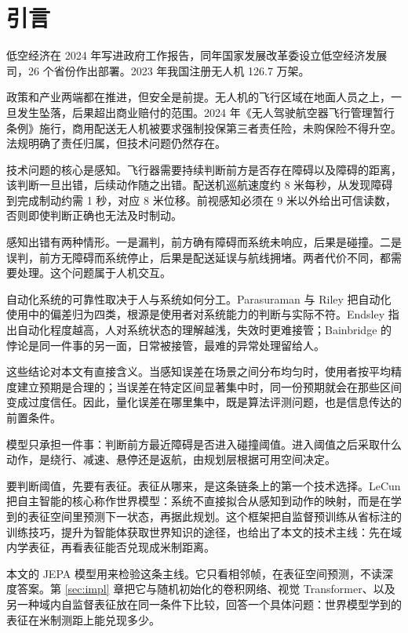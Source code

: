 \documentclass[12pt,a4paper]{ctexart}
\begin{document}
\section{引言}

低空经济在 2024 年写进政府工作报告，同年国家发展改革委设立低空经济发展司，26 个省份作出部署。2023 年我国注册无人机 126.7 万架。

政策和产业两端都在推进，但安全是前提。无人机的飞行区域在地面人员之上，一旦发生坠落，后果超出商业赔付的范围。2024 年《无人驾驶航空器飞行管理暂行条例》施行，商用配送无人机被要求强制投保第三者责任险，未购保险不得升空。法规明确了责任归属，但技术问题仍然存在。

技术问题的核心是感知。飞行器需要持续判断前方是否存在障碍以及障碍的距离，该判断一旦出错，后续动作随之出错。配送机巡航速度约 8 米每秒，从发现障碍到完成制动约需 1 秒，对应 8 米位移。前视感知必须在 9 米以外给出可信读数，否则即使判断正确也无法及时制动。

感知出错有两种情形。一是漏判，前方确有障碍而系统未响应，后果是碰撞。二是误判，前方无障碍而系统停止，后果是配送延误与航线拥堵。两者代价不同，都需要处理。这个问题属于人机交互。

自动化系统的可靠性取决于人与系统如何分工。Parasuraman 与 Riley 把自动化使用中的偏差归为四类，根源是使用者对系统能力的判断与实际不符\cite{parasuraman}。Endsley 指出自动化程度越高，人对系统状态的理解越浅，失效时更难接管\cite{endsley}；Bainbridge 的悖论是同一件事的另一面，日常被接管，最难的异常处理留给人\cite{bainbridge}。

这些结论对本文有直接含义。当感知误差在场景之间分布均匀时，使用者按平均精度建立预期是合理的；当误差在特定区间显著集中时，同一份预期就会在那些区间变成过度信任。因此，量化误差在哪里集中，既是算法评测问题，也是信息传达的前置条件。

模型只承担一件事：判断前方最近障碍是否进入碰撞阈值。进入阈值之后采取什么动作，是绕行、减速、悬停还是返航，由规划层根据可用空间决定。

要判断阈值，先要有表征。表征从哪来，是这条链条上的第一个技术选择。LeCun 把自主智能的核心称作世界模型：系统不直接拟合从感知到动作的映射，而是在学到的表征空间里预测下一状态，再据此规划\cite{lecun}。这个框架把自监督预训练从省标注的训练技巧，提升为智能体获取世界知识的途径，也给出了本文的技术主线：先在域内学表征，再看表征能否兑现成米制距离。

本文的 JEPA 模型用来检验这条主线。它只看相邻帧，在表征空间预测，不读深度答案。第 \ref{sec:impl} 章把它与随机初始化的卷积网络、视觉 Transformer、以及另一种域内自监督表征放在同一条件下比较，回答一个具体问题：世界模型学到的表征在米制测距上能兑现多少。
\end{document}
